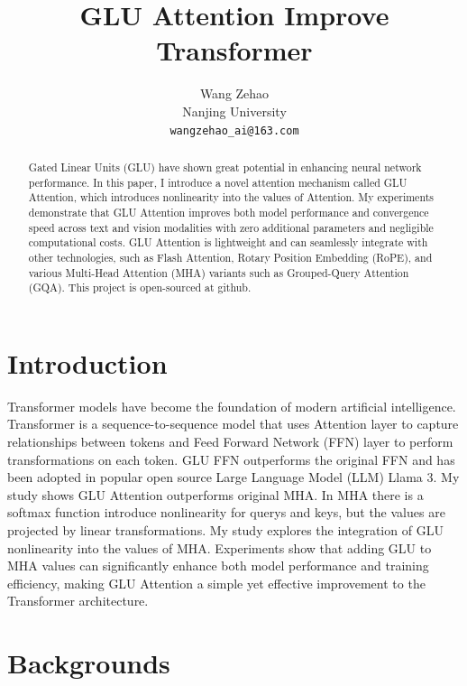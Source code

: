 \documentclass[11pt]{article}
\title{GLU Attention Improve Transformer}
\author{
Wang Zehao \\
Nanjing University \\
\texttt{wangzehao\_ai@163.com}
}
\begin{document}
\maketitle

\begin{abstract}

Gated Linear Units (GLU) have shown great potential in enhancing neural network performance. In this paper, I introduce a novel attention mechanism called GLU Attention, which introduces nonlinearity into the values of Attention. My experiments demonstrate that GLU Attention improves both model performance and convergence speed across text and vision modalities with zero additional parameters and negligible computational costs. GLU Attention is lightweight and can seamlessly integrate with other technologies, such as Flash Attention, Rotary Position Embedding (RoPE), and various Multi-Head Attention (MHA) variants such as Grouped-Query Attention (GQA). This project is open-sourced at github\cite{wangzehao2025gluattentiongithub}.
\end{abstract}


\section{Introduction}

Transformer\cite{vaswani2023attentionneed} models have become the foundation of modern artificial intelligence. Transformer is a sequence-to-sequence model that uses Attention layer to capture relationships between tokens and Feed Forward Network (FFN) layer to perform transformations on each token. GLU FFN\cite{shazeer2020gluvariantsimprovetransformer} outperforms the original FFN and has been adopted in popular open source Large Language Model (LLM) Llama 3\cite{grattafiori2024llama3herdmodels}. My study shows GLU Attention outperforms original MHA. In MHA there is a softmax function introduce nonlinearity for querys and keys, but the values are projected by linear transformations. My study explores the integration of GLU nonlinearity into the values of MHA. Experiments show that adding GLU to MHA values can significantly enhance both model performance and training efficiency, making GLU Attention a simple yet effective improvement to the Transformer architecture.

\section{Backgrounds}
\end{document}
